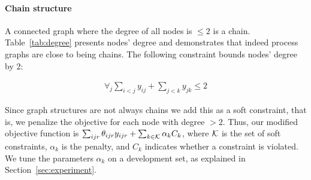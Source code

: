 \paragraph{Chain structure} 
A connected graph where the degree of all nodes is $\leq 2$ is a chain. Table~\ref{tab:degree} presents nodes' degree and demonstrates that indeed process graphs are close to being chains. The following constraint bounds nodes' degree by 2:

\begin{align}
\forall_j \sum_{i<j} y_{ij} + \sum_{j<k} y_{jk} \leq 2
\end{align}

Since graph structures are not always chains we add this as a soft constraint, that is, we penalize the objective for each node with degree $>2$. Thus, our modified objective function is $\sum_{ijr} \theta_{ijr} y_{ijr} + \sum_{k \in \mathcal{K}} \alpha_k C_k$, where $\mathcal{K}$ is the set of soft constraints, $\alpha_k$ is the penalty, and $C_k$ indicates whether a constraint is violated. We tune the parameters $\alpha_k$ on a development set, as explained in Section~\ref{sec:experiment}.

